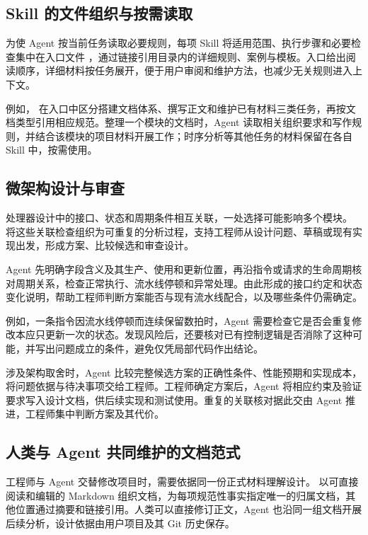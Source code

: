 \documentclass[UTF8,fontset=none,zihao=-4,a4paper]{ctexart}
\begin{document}
\subsection{Skill 的文件组织与按需读取}

为使 Agent 按当前任务读取必要规则，每项 Skill 将适用范围、执行步骤和必要检查集中在入口文件 ，通过链接引用目录内的详细规则、案例与模板。入口给出阅读顺序，详细材料按任务展开，便于用户审阅和维护方法，也减少无关规则进入上下文。

例如， 在入口中区分搭建文档体系、撰写正文和维护已有材料三类任务，再按文档类型引用相应规范。整理一个模块的文档时，Agent 读取相关组织要求和写作规则，并结合该模块的项目材料开展工作；时序分析等其他任务的材料保留在各自 Skill 中，按需使用。

\subsection{微架构设计与审查}

处理器设计中的接口、状态和周期条件相互关联，一处选择可能影响多个模块。 将这些关联检查组织为可重复的分析过程，支持工程师从设计问题、草稿或现有实现出发，形成方案、比较候选和审查设计。

Agent 先明确字段含义及其生产、使用和更新位置，再沿指令或请求的生命周期核对周期关系，检查正常执行、流水线停顿和异常处理。由此形成的接口约定和状态变化说明，帮助工程师判断方案能否与现有流水线配合，以及哪些条件仍需确定。

例如，一条指令因流水线停顿而连续保留数拍时，Agent 需要检查它是否会重复修改本应只更新一次的状态。发现风险后，还要核对已有控制逻辑是否消除了这种可能，并写出问题成立的条件，避免仅凭局部代码作出结论。

涉及架构取舍时，Agent 比较完整候选方案的正确性条件、性能预期和实现成本，将问题依据与待决事项交给工程师。工程师确定方案后，Agent 将相应约束及验证要求写入设计文档，供后续实现和测试使用。重复的关联核对据此交由 Agent 推进，工程师集中判断方案及其代价。

\subsection{人类与 Agent 共同维护的文档范式}

工程师与 Agent 交替修改项目时，需要依据同一份正式材料理解设计。 以可直接阅读和编辑的 Markdown 组织文档，为每项规范性事实指定唯一的归属文档，其他位置通过摘要和链接引用。人类可以直接修订正文，Agent 也沿同一组文档开展后续分析，设计依据由用户项目及其 Git 历史保存。
\end{document}
